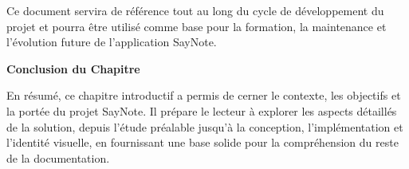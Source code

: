 Ce document servira de référence tout au long du cycle de développement du projet et pourra être utilisé comme base pour la formation, la maintenance et l'évolution future de l'application SayNote. 

\vspace{1cm}
\begin{center}
\textbf{\large Conclusion du Chapitre}
\end{center}

\noindent
En résumé, ce chapitre introductif a permis de cerner le contexte, les objectifs et la portée du projet SayNote. Il prépare le lecteur à explorer les aspects détaillés de la solution, depuis l'étude préalable jusqu'à la conception, l'implémentation et l'identité visuelle, en fournissant une base solide pour la compréhension du reste de la documentation.